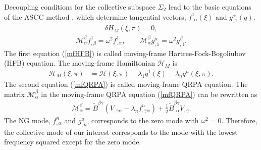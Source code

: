 \documentclass[11pt]{book} %
\begin{document}
Decoupling conditions for the collective subspace $\Sigma_2$ lead to
the basic equations of the ASCC method \cite{MNM00,N2012},
which determine tangential vectors,
$f^1_{,\alpha}(\xi)$ and $g_{,1}^{\alpha}(q)$.
\begin{align}
  \delta H_M(\xi,\pi) = 0, \label{mfHFB}
  \end{align}\begin{align}
 \mathcal{M}^\beta_\alpha f^1_{,\beta}  = \omega^2 f^1_{,\alpha},\hspace{2em} 
\mathcal{M}^\beta_\alpha g^{\alpha}_{,1} = \omega^2 g^{\beta}_{,1} .
  \label{mfQRPA}
\end{align}
The first equation (\ref{mfHFB}) is called moving-frame
Hartree-Fock-Bogoliubov (HFB) equation.
The moving-frame Hamiltonian $\mathcal{H}_M$
is
\begin{align}
\mathcal{H}_M(\xi,\pi) &= \mathcal{H}(\xi,\pi)
	-\lambda_{1} q^1(\xi) - \lambda_{n} q^n(\xi,\pi) .
\label{H_M}
\end{align}
The second equation (\ref{mfQRPA}) is called moving-frame QRPA equation.
The matrix $\mathcal{M}^\beta_\alpha$ in the moving-frame QRPA
equation (\ref{mfQRPA}) can be rewritten as 
 \begin{align}
\mathcal{M}^{\beta}_{\alpha} =
	 \tilde{B}^{\beta\gamma}
	 \left(V_{,\gamma\alpha}-\lambda_{n}f^n_{,\gamma\alpha}\right)
	+ \frac{1}{2}\tilde{B}^{\beta\gamma}_{,\alpha}V_{,\gamma} 
\label{M}.
\end{align}
The NG mode, $f^n_{,\alpha}$ and $g^\alpha_{,n}$, corresponds to
the zero mode with $\omega^2=0$.
Therefore, the collective mode of our interest corresponds to
the mode with the lowest frequency squared except for the zero mode.
\end{document}
